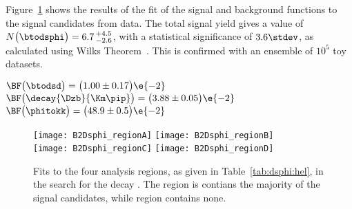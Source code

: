 Figure~\ref{fig:dsphi:fits} shows the results of the fit of the signal and background functions to
the signal candidates from data.
The total signal yield gives a value of $N\big(\btodsphi\big)=6.7\,^{+4.5}_{-2.6}$, with a
statistical significance of $3.6\stdev$, as calculated using Wilks Theorem~\cite{wilks1938}.
This is confirmed with an ensemble of $10^5$ toy datasets.


$\BF\big(\btodsd\big)=\big(1.00\pm0.17\big)\e{-2}$
$\BF\big(\decay{\Dzb}{\Km\pip}\big)=\big(3.88\pm0.05\big)\e{-2}$
$\BF\big(\phitokk\big)=\big(48.9\pm0.5\big)\e{-2}$


\begin{figure}
  \begin{center}
    \texttt{[image: B2Dsphi\_regionA]}
    \texttt{[image: B2Dsphi\_regionB]}\\
    \texttt{[image: B2Dsphi\_regionC]}
    \texttt{[image: B2Dsphi\_regionD]}
    \caption{\small
      Fits to the four analysis regions, as given in Table~\ref{tab:dsphi:hel}, in the search for
      the decay \btodsphi.
      The region \rA is contians the majority of the signal candidates, while region \rD contains
      none.
    }
    \label{fig:dsphi:fits}
  \end{center}
\end{figure}




































